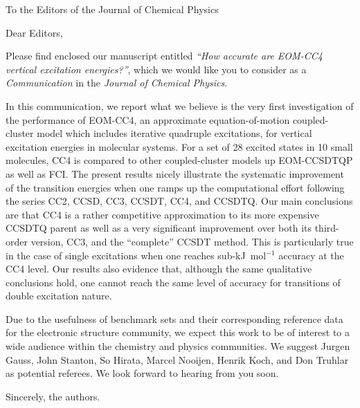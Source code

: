 \documentclass[10pt]{letter}
\begin{document}
\begin{letter}%
{To the Editors of the Journal of Chemical Physics}

\opening{Dear Editors,}

\justifying
Please find enclosed our manuscript entitled \textit{``How accurate are EOM-CC4 vertical excitation energies?''}, which we would like you to consider as a \textit{Communication} in the \textit{Journal of Chemical Physics}.

In this communication, we report what we believe is the very first investigation of the performance of EOM-CC4, an approximate equation-of-motion coupled-cluster model which includes iterative quadruple excitations, for vertical excitation energies in molecular systems.
For a set of 28 excited states in 10 small molecules, CC4 is compared to other coupled-cluster models up EOM-CCSDTQP as well as FCI.
The present results nicely illustrate the systematic improvement of the transition energies when one ramps up the computational effort following the series CC2, CCSD, CC3, CCSDT, CC4, and CCSDTQ.
Our main conclusions are that CC4 is a rather competitive approximation to its more expensive CCSDTQ parent as well as a very significant improvement over both its third-order version, CC3, and the ``complete'' CCSDT method.
This is particularly true in the case of single excitations when one reaches sub-kJ~mol$^{-1}$ accuracy at the CC4 level.
Our results also evidence that, although the same qualitative conclusions hold, one cannot reach the same level of accuracy for transitions of double excitation nature.

Due to the usefulness of benchmark sets and their corresponding reference data for the electronic structure community, we expect this work to be of interest to a wide audience within the chemistry and physics communities.
We suggest Jurgen Gauss, John Stanton, So Hirata, Marcel Nooijen, Henrik Koch, and Don Truhlar as potential referees.	
We look forward to hearing from you soon.

\closing{Sincerely, the authors.}


\end{letter}
\end{document}
